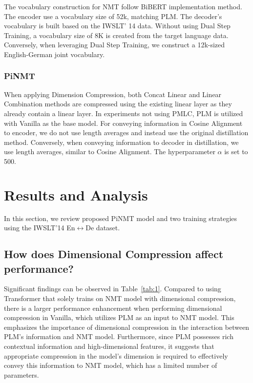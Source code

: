 \documentclass[conference]{IEEEtran}
\begin{document}
The vocabulary construction for NMT follow BiBERT \cite{xu2021bibert} implementation method. The encoder use a vocabulary size of 52k, matching PLM. The decoder's vocabulary is built based on the IWSLT' 14 data. Without using Dual Step Training, a vocabulary size of 8K is created from the target language data. Conversely, when leveraging Dual Step Training, we construct a 12k-sized English-German joint vocabulary.

\subsubsection{PiNMT}
When applying Dimension Compression, both Concat Linear and Linear Combination methods are compressed using the existing linear layer as they already contain a linear layer. In experiments not using PMLC, PLM is utilized with Vanilla as the base model. For conveying information in Cosine Alignment to encoder, we do not use length averages and instead use the original distillation method. Conversely, when conveying information to decoder in distillation, we use length averages, similar to Cosine Alignment. The hyperparameter $\alpha$ is set to 500.



\section{Results and Analysis}
In this section, we review proposed PiNMT model and two training strategies using the IWSLT'14 En$\leftrightarrow$De dataset.
\subsection{How does Dimensional Compression affect performance?}
Significant findings can be observed in Table~\ref{tab:1}. Compared to using Transformer that solely trains on NMT model with dimensional compression, there is a larger performance enhancement when performing dimensional compression in Vanilla, which utilizes PLM as an input to NMT model. This emphasizes the importance of dimensional compression in the interaction between PLM's information and NMT model. Furthermore, since PLM possesses rich contextual information and high-dimensional features, it suggests that appropriate compression in the model's dimension is required to effectively convey this information to NMT model, which has a limited number of parameters.
\end{document}
